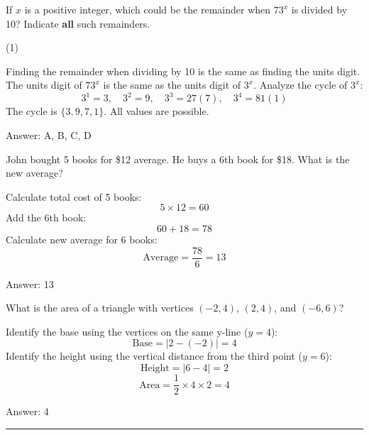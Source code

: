 \documentclass[11pt,paper=a4,answers]{exam}
\begin{document}
\begin{questions}
\question
If $x$ is a positive integer, which could be the remainder when $73^x$ is divided by 10?
Indicate \textbf{all} such remainders.

\begin{tasks}(1)
   
\end{tasks}

\begin{solution}
Finding the remainder when dividing by 10 is the same as finding the units digit. The units digit of $73^x$ is the same as the units digit of $3^x$.
\vspace{5pt}
Analyze the cycle of $3^x$:
\vspace{5pt}
\[ 3^1 = 3, \quad 3^2 = 9, \quad 3^3 = 27 (7), \quad 3^4 = 81 (1) \]
\vspace{5pt}
The cycle is $\{3, 9, 7, 1\}$. All values are possible.

Answer: \colorbox{yellow!100}{A, B, C, D}
\end{solution}

\vspace{1cm}


\question
John bought 5 books for \$12 average. He buys a 6th book for \$18. What is the new average?

\begin{solution}
Calculate total cost of 5 books:
\vspace{5pt}
\[ 5 \times 12 = 60 \]
\vspace{5pt}
Add the 6th book:
\vspace{5pt}
\[ 60 + 18 = 78 \]
\vspace{5pt}
Calculate new average for 6 books:
\vspace{5pt}
\[ \text{Average} = \dfrac{78}{6} = 13 \]

Answer: \colorbox{yellow!100}{13}
\end{solution}

\vspace{1cm}

\question
What is the area of a triangle with vertices $(-2, 4)$, $(2, 4)$, and $(-6, 6)$?

\begin{solution}
Identify the base using the vertices on the same y-line ($y=4$):
\vspace{5pt}
\[ \text{Base} = |2 - (-2)| = 4 \]
\vspace{5pt}
Identify the height using the vertical distance from the third point ($y=6$):
\vspace{5pt}
\[ \text{Height} = |6 - 4| = 2 \]
\vspace{5pt}
\[ \text{Area} = \dfrac{1}{2} \times 4 \times 2 = 4 \]

Answer: \colorbox{yellow!100}{4}
\end{solution}

\end{questions}

\begin{center}
\rule{.5\textwidth}{1pt}
\end{center}
\end{document}
